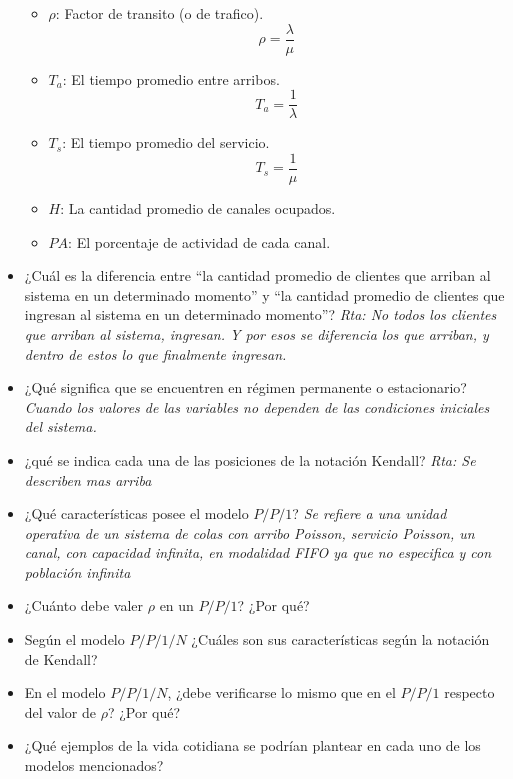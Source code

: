 \documentclass{article}
\begin{document}
\begin{itemize}
\begin{itemize}
            \item \(\rho\): Factor de transito (o de trafico).
                \begin{equation}
                    \rho = \frac{\lambda}{\mu}
                \end{equation}
            \item \(T_a\): El tiempo promedio entre arribos.
                \begin{equation}
                    T_a = \frac{1}{\lambda}
                \end{equation}
            \item \(T_s\): El tiempo promedio del servicio.
                \begin{equation}
                    T_s = \frac{1}{\mu}
                \end{equation}
            \item \(H\): La cantidad promedio de canales ocupados.
            \item \(PA\): El porcentaje de actividad de cada canal.
        \end{itemize}
    \item ¿Cuál es la diferencia entre “la cantidad promedio de clientes que arriban al sistema en un determinado momento” y “la cantidad promedio de clientes que ingresan al sistema en un determinado momento”?
        \newline\textit{Rta: No todos los clientes que arriban al sistema, ingresan. Y por esos se diferencia los que arriban, y dentro de estos lo que finalmente ingresan.}
    \item ¿Qué significa que se encuentren en régimen permanente o estacionario?
        \newline\textit{Cuando los valores de las variables no dependen de las condiciones iniciales del sistema.}       
    \item ¿qué se indica cada una de las posiciones de la notación Kendall?
        \newline\textit{Rta: Se describen mas arriba}
    \item ¿Qué características posee el modelo \(P/P/1\)?
        \newline\textit{Se refiere a una unidad operativa de un sistema de colas con arribo Poisson, servicio Poisson, un canal, con capacidad infinita, en modalidad FIFO ya que no especifica y con población infinita}
    \item ¿Cuánto debe valer \(\rho\) en un \(P/P/1\)? ¿Por qué?
        
    \item Según el modelo \(P/P/1/N\) ¿Cuáles son sus características según la notación de Kendall?
    \item En el modelo \(P/P/1/N\), ¿debe verificarse lo mismo que en el \(P/P/1\) respecto del valor de \(\rho\)? ¿Por qué?
    \item ¿Qué ejemplos de la vida cotidiana se podrían plantear en cada uno de los modelos mencionados?
\end{itemize}
\end{document}
